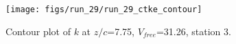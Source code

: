 \begin{figure}[H]
\centering
\texttt{[image: figs/run\_29/run\_29\_ctke\_contour]}
\caption{Contour plot of $k$ at $z/c$=7.75, $V_{free}$=31.26, station 3.}
\label{fig:run_29_ctke_contour}
\end{figure}


